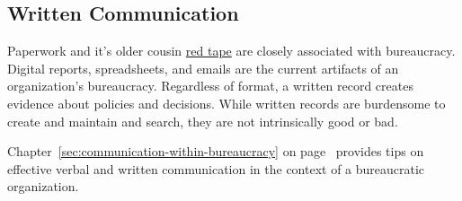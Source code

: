 \subsection*{Written Communication\label{sec:written-communication}}

Paperwork and it's older cousin \href{https://en.wikipedia.org/wiki/Red_tape}{red tape} are closely associated with bureaucracy.
Digital reports, spreadsheets, and emails are the current artifacts of an organization's bureaucracy. Regardless of format, a written record creates evidence about policies and decisions. %
While written records are burdensome to create and maintain and search, they are not intrinsically good or bad. 

Chapter~\ref{sec:communication-within-bureaucracy} on page~\pageref{sec:communication-within-bureaucracy} provides tips on effective verbal and written communication in the context of a bureaucratic organization. 